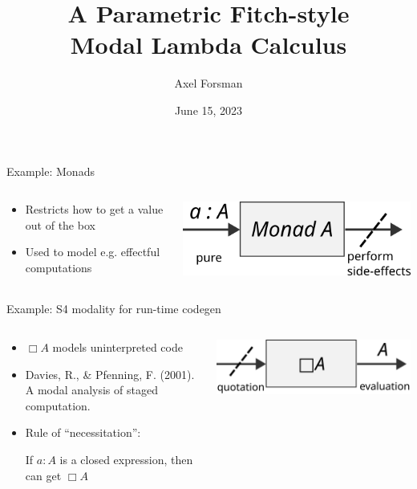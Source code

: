 \documentclass{beamer}
\title{A Parametric Fitch-style \\ Modal Lambda Calculus}
\author{Axel Forsman}
\institute[CTH]{Chalmers University of Technology}
\date{June 15, 2023}
\begin{document}
\frame{\titlepage}

\begin{frame}{Example: Monads}
  \begin{columns}
    \begin{column}{.49\textwidth}
      \begin{itemize}
      \item Restricts how to get a value out of the box
      \item Used to model e.g. effectful computations
      \end{itemize}
    \end{column}

    \begin{column}{.49\textwidth}
        \includegraphics[width=\textwidth]{monad}
    \end{column}
  \end{columns}
\end{frame}

\begin{frame}{Example: S4 modality for run-time codegen}
  \begin{columns}
    \begin{column}{.49\textwidth}
      \begin{itemize}
      \item $\Box A$ models uninterpreted code
      \item Davies, R., \& Pfenning, F. (2001). A modal analysis of staged computation.
      \item Rule of ``necessitation'':

        If $a : A$ is a closed expression, then can get $\Box A$
      \end{itemize}
    \end{column}

    \begin{column}{.49\textwidth}
        \includegraphics[width=\textwidth]{s4-staged-computation}
    \end{column}
  \end{columns}
\end{frame}
\end{document}

